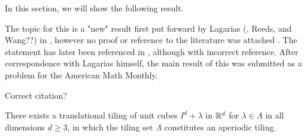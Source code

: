 \documentclass[../thesis.tex]{subfiles}
\begin{document}
%
%

In this section, we will show the following result. 

The topic for this  is a "new" result first put forward by Lagarias (, Reeds, and Wang??) in \cite{lagariasOrthonormalBasesExponentials2000}, however no proof or reference to the literature was attached . The statement has later been referenced in \cite{liuUniformityNonUniformGabor2003}, although with incorrect reference. After correspondence with Lagarias himself, the main result of this  was submitted as a problem for the American Math Monthly. 


Correct citation?
\cite{haugeTitle}

\begin{theorem}
    There exists a translational tiling of unit cubes $I^d + \lambda$ in $\mathbb{R}^d$ for $\lambda\in \Lambda$ in all dimensions $d\geq3$, in which the tiling set $\Lambda$ constitutes an aperiodic tiling. 
\end{theorem}
\end{document}
